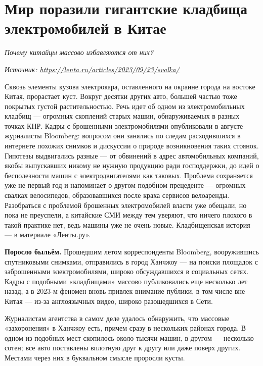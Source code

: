 \newpage
\section{Мир поразили гигантские кладбища электромобилей в Китае}

\textit{Почему китайцы массово избавляются от них?}

\textit{Источник: \url{https://lenta.ru/articles/2023/09/23/svalka/}}

Сквозь элементы кузова электрокара, оставленного на окраине города на востоке Китая, прорастает куст. Вокруг  десятки других авто, большей частью тоже покрытых густой растительностью. Речь идет об одном из электромобильных кладбищ --- огромных скоплений старых машин, обнаруживаемых в разных точках КНР. Кадры с брошенными электромобилями опубликовали в августе журналисты Bloomberg: вопросом они занялись по следам расходившихся в интернете похожих снимков и дискуссии о природе возникновения таких стоянок. Гипотезы выдвигались разные — от обвинений в адрес автомобильных компаний, якобы выпускавших никому не нужную продукцию ради господдержки, до идей о бесполезности машин с электродвигателями как таковых. Проблема сохраняется уже не первый год и напоминает о другом подобном прецеденте — огромных свалках велосипедов, образовавшихся после краха сервисов велоаренды. Разобраться с проблемой брошенных электромобилей власти уже обещали, но пока не преуспели, а китайские СМИ между тем уверяют, что ничего плохого в такой практике нет, ведь машины уже не очень новые. Кладбищенская история — в материале «Ленты.ру».

\textbf{Поросло быльём.} Прошедшим летом корреспонденты Bloomberg, вооружившись спутниковыми снимками, отправились в город Ханчжоу --- на поиски площадок с заброшенными электромобилями, широко обсуждавшихся в социальных сетях. Кадры с подобными «кладбищами» массово публиковались еще несколько лет назад, а в 2023-м феномен вновь привлек внимание публики, в том числе вне Китая — из-за англоязычных видео, широко разошедшихся в Сети.

Журналистам агентства в самом деле удалось обнаружить, что массовые «захоронения» в Ханчжоу есть, причем сразу в нескольких районах города. В одном из подобных мест скопилось около тысячи машин, в другом — несколько сотен; все авто поставлены вплотную друг к другу или даже поверх других. Местами через них в буквальном смысле проросли кусты.

